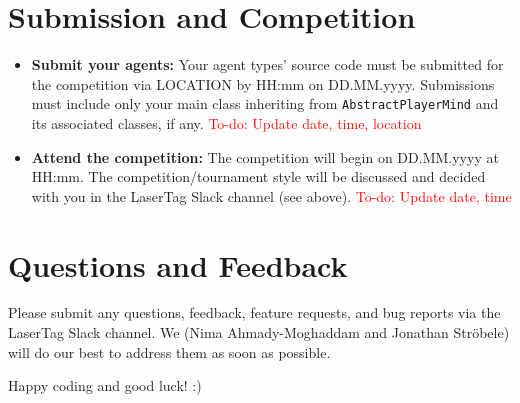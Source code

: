 \documentclass[
    a4paper,
    english,
    DIV=16,
    11pt,
    parskip=half,
]{scrartcl}
\newcommand\todo[1]{\textcolor{red}{#1}}
\begin{document}
\section*{Submission and Competition}

\begin{itemize}
  \item \textbf{Submit your agents:} Your agent types' source code must be submitted for the competition via LOCATION by HH:mm on DD.MM.yyyy. Submissions must include only your main class inheriting from \texttt{AbstractPlayerMind} and its associated classes, if any. \todo{To-do: Update date, time, location}
  \item \textbf{Attend the competition:} The competition will begin on DD.MM.yyyy at HH:mm. The competition/tournament style will be discussed and decided with you in the LaserTag Slack channel (see above). \todo{To-do: Update date, time}
\end{itemize}

\section*{Questions and Feedback}
Please submit any questions, feedback, feature requests, and bug reports via the LaserTag Slack channel. We (Nima Ahmady-Moghaddam and Jonathan Ströbele) will do our best to address them as soon as possible.

Happy coding and good luck! :)

\end{document}
